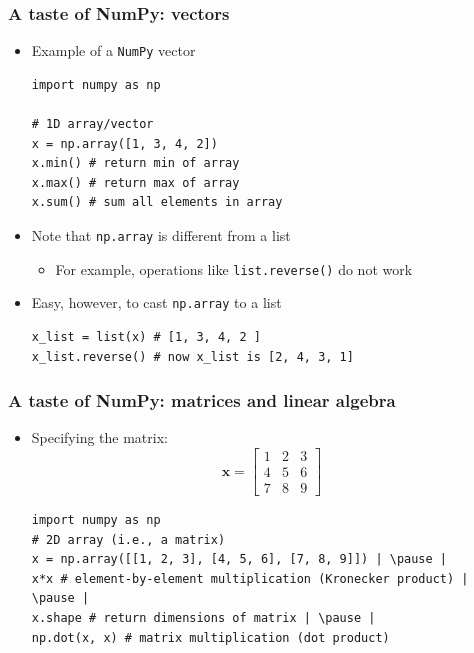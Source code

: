 \documentclass[xcolor=table]{beamer}
\begin{document}
\begin{frame}[fragile]
\frametitle{A taste of NumPy: vectors}
    \begin{itemize}
        \item Example of a \texttt{NumPy} vector
\begin{lstlisting}[style=python]
import numpy as np

# 1D array/vector
x = np.array([1, 3, 4, 2])
x.min() # return min of array 
x.max() # return max of array
x.sum() # sum all elements in array
\end{lstlisting}
\pause 
    \item Note that \texttt{np.array} is different from a list
        \pause
        \begin{itemize}
            \item For example, operations like \texttt{list.reverse()} do not work
        \end{itemize}
            \pause
    \item Easy, however, to cast \texttt{np.array} to a list
        \pause 
\begin{lstlisting}[style=python]
x_list = list(x) # [1, 3, 4, 2 ]
x_list.reverse() # now x_list is [2, 4, 3, 1]
\end{lstlisting}
    \end{itemize}
\end{frame}

\begin{frame}[fragile]
\frametitle{A taste of NumPy: matrices and linear algebra}
    \begin{itemize}
        \item Specifying the matrix:
            $$ \mathbf{x} =  \left [ \begin{array}{ccc} 
                1 & 2 & 3 \\
                4 & 5 & 6 \\
                7 & 8 & 9 
            \end{array} \right ] $$ \pause
\begin{lstlisting}[style=python]
import numpy as np
# 2D array (i.e., a matrix)
x = np.array([[1, 2, 3], [4, 5, 6], [7, 8, 9]]) | \pause |
x*x # element-by-element multiplication (Kronecker product) | \pause |
x.shape # return dimensions of matrix | \pause |
np.dot(x, x) # matrix multiplication (dot product)
\end{lstlisting}
    \end{itemize}
\end{frame}
\end{document}
